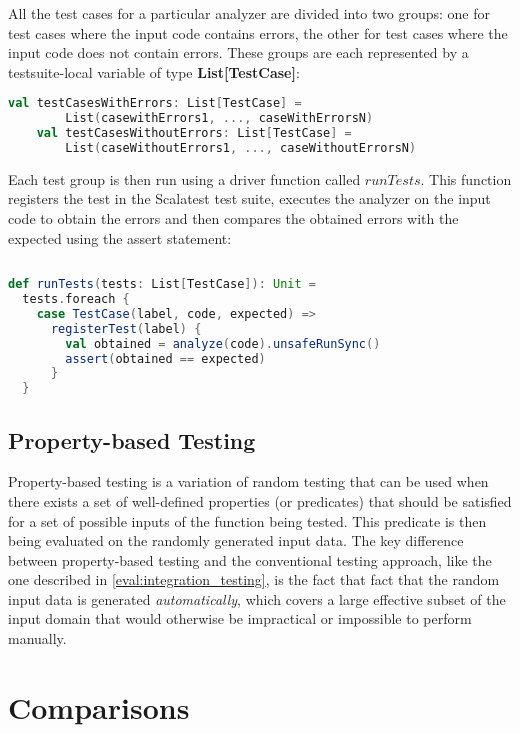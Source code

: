 All the test cases for a particular analyzer are divided into two groups: one for test cases where the input code contains errors, the other for test cases where the input code does not contain errors. These groups are each represented by a testsuite-local variable of type \textbf{List[TestCase]}:
\begin{lstlisting}[language=Scala]
    val testCasesWithErrors: List[TestCase] = 
        List(casewithErrors1, ..., caseWithErrorsN)
    val testCasesWithoutErrors: List[TestCase] = 
        List(caseWithoutErrors1, ..., caseWithoutErrorsN)
\end{lstlisting}

Each test group is then run using a driver function called $runTests$. This function registers the test in the Scalatest test suite, executes the analyzer on the input code to obtain the errors and then compares the obtained errors with the expected using the assert statement:
\begin{lstlisting}[language=Scala]
    
def runTests(tests: List[TestCase]): Unit =
  tests.foreach { 
    case TestCase(label, code, expected) =>
      registerTest(label) {
        val obtained = analyze(code).unsafeRunSync()
        assert(obtained == expected)
      }
  }

\end{lstlisting}

\subsection{Property-based Testing}
Property-based testing is a variation of random testing that can be used when there exists a set of well-defined properties (or predicates) that should be satisfied for a set of possible inputs of the function being tested.  This predicate is then being evaluated on the randomly generated input data. The key difference between property-based testing and the conventional testing approach, like the one described in \ref{eval:integration_testing}, is the fact that fact that the random input data is generated \textit{automatically}, which covers a large effective subset of the input domain that would otherwise be impractical or impossible to perform manually. 

\section{Comparisons}
\label{eval:comparisons}
